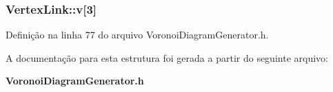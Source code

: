 \subsubsection[{v}]{ Vertex\+Link\+::v[3]}\label{struct_vertex_link_af2a8f089dfc998225d1e7d5dd7e4c92d}


Definição na linha 77 do arquivo Voronoi\+Diagram\+Generator.\+h.



A documentação para esta estrutura foi gerada a partir do seguinte arquivo\+:\begin{DoxyCompactItemize}
\item 
{\bf Voronoi\+Diagram\+Generator.\+h}\end{DoxyCompactItemize}
